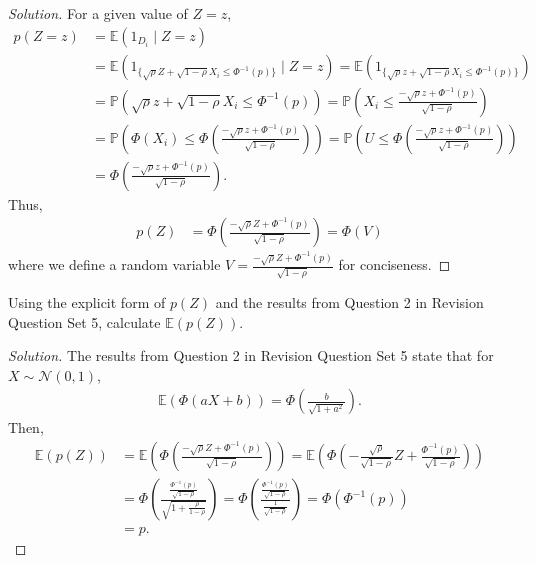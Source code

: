\documentclass[10pt]{article}
\newcommand{\E}{\mathbb{E}}
\newenvironment{problem}[2][Problem]{\begin{trivlist}
\item[\hskip \labelsep {\bfseries #1}\hskip \labelsep {\bfseries #2.}]}{\end{trivlist}}
\begin{document}
\begin{proof}[Solution]
    For a given value of $Z = z$,
    \begin{align*}
        p(Z = z) &= \E(1_{D_i} \mid Z = z) \\
        &= \E \left( 1_{\{ \sqrt{\rho} Z + \sqrt{1 - \rho} X_i \leq \Phi^{-1}(p) \}} \mid Z = z \right) = \E \left( 1_{\{ \sqrt{\rho} z + \sqrt{1 - \rho} X_i \leq \Phi^{-1}(p) \}} \right) \\
        &= \mathbb{P} \left( \sqrt{\rho} z + \sqrt{1 - \rho} X_i \leq \Phi^{-1}(p) \right) = \mathbb{P} \left( X_i \leq \frac{-\sqrt{\rho} z + \Phi^{-1}(p)}{\sqrt{1 - \rho}} \right) \\
        &= \mathbb{P} \left( \Phi(X_i) \leq \Phi \left( \frac{-\sqrt{\rho} z + \Phi^{-1}(p)}{\sqrt{1 - \rho}} \right) \right) = \mathbb{P} \left( U \leq \Phi \left( \frac{-\sqrt{\rho} z + \Phi^{-1}(p)}{\sqrt{1 - \rho}} \right) \right) \\
        &= \Phi \left( \frac{-\sqrt{\rho} z + \Phi^{-1}(p)}{\sqrt{1 - \rho}} \right).
    \end{align*}
    Thus,
    \begin{align*}
        p(Z) &= \Phi \left( \frac{-\sqrt{\rho} Z + \Phi^{-1}(p)}{\sqrt{1 - \rho}} \right) = \Phi(V)
    \end{align*}
    where we define a random variable $V = \frac{-\sqrt{\rho} Z + \Phi^{-1}(p)}{\sqrt{1 - \rho}}$ for conciseness.
\end{proof}



\begin{problem}{3}
    Using the explicit form of $p(Z)$ and the results from Question 2 in Revision Question Set 5, calculate $\E(p(Z))$.
\end{problem}

\begin{proof}[Solution]
    The results from Question 2 in Revision Question Set 5 state that for $X \sim \mathcal{N}(0,1)$, 
    \begin{align*}
        \E \left( \Phi(aX + b) \right) = \Phi \left( \frac{b}{\sqrt{1 + a^2}} \right).
    \end{align*}
    Then,
    \begin{align*}
        \E \left( p(Z) \right) &= \E \left( \Phi \left( \frac{-\sqrt{\rho} Z + \Phi^{-1}(p)}{\sqrt{1 - \rho}} \right) \right) = \E \left( \Phi \left( -\frac{\sqrt{\rho}}{\sqrt{1 - \rho}}Z + \frac{\Phi^{-1}(p)}{\sqrt{1 - \rho}} \right) \right) \\
        &= \Phi \left( \frac{\frac{\Phi^{-1}(p)}{\sqrt{1 - \rho}}}{\sqrt{1 + \frac{\rho}{1 - \rho}}} \right) = \Phi \left( \frac{\frac{\Phi^{-1}(p)}{\sqrt{1 - \rho}}}{\frac{1}{\sqrt{1 - \rho}}} \right) = \Phi \left( \Phi^{-1}(p) \right) \\
        &= p.
    \end{align*}
\end{proof}
\end{document}
